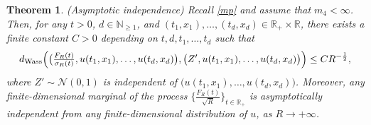 \documentclass[letterpaper, 11pt,  reqno]{amsart}
\newtheorem{theorem}{Theorem} [section]
\newcommand{\R}{\mathbb{R}}
\newcommand{\cN}{\mathcal{N}}
\newcommand{\s}{\sigma}
\newcommand{\N}{\mathbb{N}}
\numberwithin{equation}{section}
\numberwithin{theorem}{section}
\begin{document}
\begin{theorem}
\label{thm3}
 \textup{(\textsf{Asymptotic independence})} 
 Recall \eqref{mp} and assume  that $m_4<\infty$.
Then,
  for any $t>0$, $d\in\N_{\geq 1}$, and $(t_1,x_1),\ldots,(t_d,x_d) \in \R_{+} \times \R$, 
  there exists a finite  constant $C > 0$ depending on $t, d, t_1,\ldots,t_d$
   such that
 \begin{align}\label{qindep}
 d_{\rm Wass}\Big(  \big(\tfrac{F_R(t)}{\s_{R}(t)},   u(t_1,x_1),\ldots,u(t_d,x_d)  \big), 
 \big(Z', u(t_1,x_1),\ldots,u(t_d,x_d)\big)  \Big)  
 \leq C R^{-\frac12},
 \end{align}
where  $Z' \sim \cN(0,1)$ is independent of $\big(u(t_1,x_1),\ldots,u(t_d,x_d)\big)$.
Moreover,  any finite-dimensional marginal of the process $\{\tfrac{F_R(t)}{\sqrt{R} }\}_{t\in\R_+}$
is asymptotically independent 
from any finite-dimensional distribution of $u$, as $R\to+\infty$.
 \end{theorem}
\end{document}
